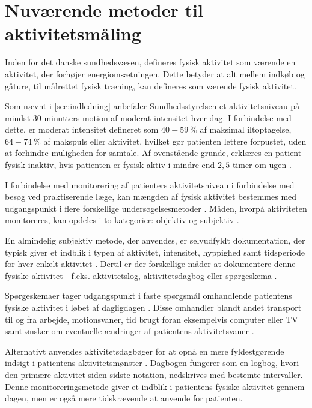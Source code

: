 \section{Nuværende metoder til aktivitetsmåling}

Inden for det danske sundhedsvæsen, defineres fysisk aktivitet som værende en aktivitet, der forhøjer energiomsætningen. 
Dette betyder at alt mellem indkøb og gåture, til målrettet fysisk træning, kan defineres som værende fysisk aktivitet\citep{motionsraad2007, terkelsen2015}.

Som nævnt i \ref{sec:indledning} anbefaler Sundhedsstyrelsen et aktivitetsniveau på mindst 30 minutters motion af moderat intensitet hver dag. 
I forbindelse med dette, er moderat intensitet defineret som $40-59~\%$ af maksimal iltoptagelse, $64-74~\%$ af makspuls eller aktivitet, hvilket gør patienten lettere forpustet, uden at forhindre muligheden for samtale. 
Af ovenstående grunde, erklæres en patient fysisk inaktiv, hvis patienten er fysisk aktiv i mindre end $2,5$ timer om ugen \citep{motionsraad2007}.

I forbindelse med monitorering af patienters aktivitetsniveau i forbindelse med besøg ved praktiserende læge, kan mængden af fysisk aktivitet bestemmes med udgangspunkt i flere forskellige undersøgelsesmetoder \citep{motionsraad2007}. 
Måden, hvorpå aktiviteten monitoreres, kan opdeles i to kategorier: objektiv og subjektiv \citep{motionsraad2007, adamo2009}. 
 

En almindelig subjektiv metode, der anvendes, er selvudfyldt dokumentation, der typisk giver et indblik i typen af aktivitet, intensitet, hyppighed samt tidsperiode for hver enkelt aktivitet \citep{adamo2009}. Dertil er der forskellige måder at dokumentere denne fysiske aktivitet - f.eks. aktivitetslog, aktivitetsdagbog eller spørgeskema \citep{adamo2009}. 


Spørgeskemaer tager udgangspunkt i faste spørgsmål omhandlende patientens fysiske aktivitet i løbet af dagligdagen \citep{muller2009}. 
Disse omhandler blandt andet transport til og fra arbejde, motionsvaner, tid brugt foran eksempelvis computer eller TV samt ønsker om eventuelle ændringer af patientens aktivitetsvaner \citep{motionsraad2007, vestergaard2012}. 

Alternativt anvendes aktivitetsdagbøger for at opnå en mere fyldestgørende indsigt i patientens aktivitetsmønster \citep{motionsraad2007,muller2009}. 
Dagbogen fungerer som en logbog, hvori den primære aktivitet siden sidste notation, nedskrives med bestemte intervaller. 
Denne monitoreringsmetode giver et indblik i patientens fysiske aktivitet gennem dagen, men er også mere tidskrævende at anvende for patienten.\citep{motionsraad2007}

